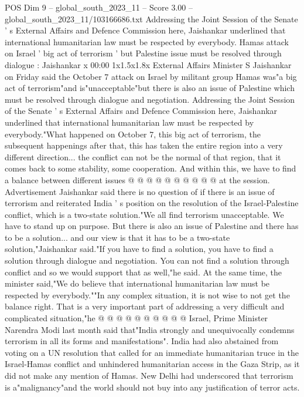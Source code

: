 \begin{textsample}{POS Dim 9 – global\_south\_2023\_11 – Score 3.00 – global\_south\_2023\_11/103166686.txt}  \label{ex:f9_pos_128}
Addressing the Joint Session of the Senate ' s External Affairs and Defence Commission here, Jaishankar underlined that international humanitarian law must be respected by everybody.
Hamas attack on Israel ' big act of terrorism ' but Palestine issue must be resolved through dialogue : Jaishankar x 00:00 1x1.5x1.8x External Affairs Minister S Jaishankar on Friday said the October 7 attack on Israel by militant group Hamas was"a big act of terrorism"and is"unacceptable"but there is also an issue of Palestine which must be resolved through dialogue and negotiation.
Addressing the Joint Session of the Senate ' s External Affairs and Defence Commission here, Jaishankar underlined that international humanitarian law must be respected by everybody."What happened on October 7, this big act of terrorism, the subsequent happenings after that, this has taken the entire region into a very different direction... the conflict can not be the normal of that region, that it comes back to some stability, some cooperation.
And within this, we have to find a balance between different issues @ @ @ @ @ @ @ @ @ @ at the session.
Advertisement Jaishankar said there is no question of if there is an issue of terrorism and reiterated India ' s position on the resolution of the Israel-Palestine conflict, which is a two-state solution."We all find terrorism unacceptable.
We have to stand up on purpose.
But there is also an issue of Palestine and there has to be a solution... and our view is that it has to be a two-state solution,"Jaishankar said."If you have to find a solution, you have to find a solution through dialogue and negotiation.
You can not find a solution through conflict and so we would support that as well,"he said.
At the same time, the minister said,"We do believe that international humanitarian law must be respected by everybody.""In any complex situation, it is not wise to not get the balance right.
That is a very important part of addressing a very difficult and complicated situation,"he @ @ @ @ @ @ @ @ @ @ Israel, Prime Minister Narendra Modi last month said that"India strongly and unequivocally condemns terrorism in all its forms and manifestations".
India had also abstained from voting on a UN resolution that called for an immediate humanitarian truce in the Israel-Hamas conflict and unhindered humanitarian access in the Gaza Strip, as it did not make any mention of Hamas.
New Delhi had underscored that terrorism is a"malignancy"and the world should not buy into any justification of terror acts.

\end{textsample}
